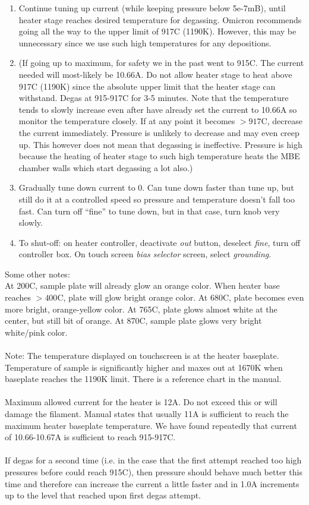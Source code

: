 \begin{enumerate}
\item	Continue tuning up current (while keeping pressure below 5e-7mB), until heater stage reaches desired temperature for degassing. Omicron recommends going all the way to the upper limit of 917C (1190K). However, this may be unnecessary since we use such high temperatures for any depositions. 
\item (If going up to maximum, for safety we in the past went to 915C. The current needed will most-likely be 10.66A. Do not allow heater stage to heat above 917C (1190K) since the absolute upper limit that the heater stage can withstand. Degas at 915-917C for 3-5 minutes. Note that the temperature tends to slowly increase even after have already set the current to 10.66A so monitor the temperature closely. If at any point it becomes $>917$C, decrease the current immediately. Pressure is unlikely to decrease and may even creep up. This however does not mean that degassing is ineffective. Pressure is high because the heating of heater stage to such high temperature heats the MBE chamber walls which start degassing a lot also.)
\item	Gradually tune down current to 0. Can tune down faster than tune up, but still do it at a controlled speed so pressure and temperature doesn’t fall too fast. Can turn off “fine” to tune down, but in that case, turn knob very slowly.
\item	To shut-off: on heater controller, deactivate \emph{out} button, deselect \emph{fine}, turn off controller box. On touch screen \emph{bias selector} screen, select \emph{grounding}.
\end{enumerate}
Some other notes:\\
At 200C, sample plate will already glow an orange color. When heater base reaches $>400$C, plate will glow bright orange color. At 680C, plate becomes even more bright, orange-yellow color. At 765C, plate glows almost white at the center, but still bit of orange. At 870C, sample plate glows very bright white/pink color.\\\\
Note: The temperature displayed on touchscreen is at the heater baseplate. Temperature of sample is significantly higher and maxes out at 1670K when baseplate reaches the 1190K limit. There is a reference chart in the manual.\\\\
Maximum allowed current for the heater is 12A. Do not exceed this or will damage the filament. Manual states that usually 11A is sufficient to reach the maximum heater baseplate temperature. We have found repeatedly that current of 10.66-10.67A is sufficient to reach 915-917C.\\\\
If degas for a second time (i.e. in the case that the first attempt reached too high pressures before could reach 915C), then pressure should behave much better this time and therefore can increase the current a little faster and in 1.0A increments up to the level that reached upon first degas attempt.

